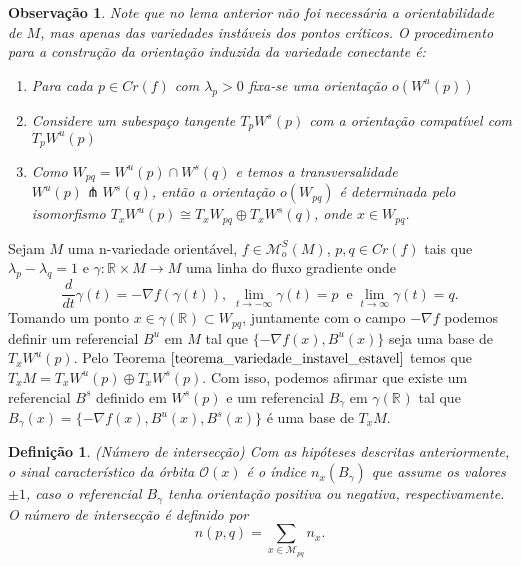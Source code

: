 \documentclass[12pt]{book}
\newtheorem{definicao}[teorema]{Definição}
\newtheorem{observacao}[teorema]{Observação}
\newcommand{\derivada}[2]{\frac{d #1}{d #2}}
\newcommand{\espacomoduli}[2]{\mathcal{M}_{#1#2}}
\newcommand{\espacotangenteponto}[2]{T_{#1}#2}
\newcommand{\funcoesmorsesmale}[1]{\mathcal{M}^{S}_{o}(#1)}
\newcommand{\gradiente}{\nabla f}
\newcommand{\orbitaponto}[1]{\mathcal{O}(#1)}
\newcommand{\pontoscriticos}[1]{\textit{Cr}(#1)}
\newcommand{\retacartesianovariedade}{\real{} \times M}
\newcommand{\real}[1]{\mathbb{R}^{#1}}
\newcommand{\reta}{\real{}}
\newcommand{\variedadeconectantepontos}[2]{W_{#1#2}}
\newcommand{\variedadeestavel}[1]{W^{s}(#1)}
\newcommand{\variedadeinstavel}[1]{W^{u}(#1)}
\begin{document}
	\begin{observacao}
		Note que no lema anterior não foi necessária a orientabilidade de $M$, mas apenas das variedades instáveis dos pontos críticos. O procedimento para a construção da orientação induzida da variedade conectante é:
		\begin{enumerate}
			\item Para cada $p\in \pontoscriticos{f}$ com $\lambda_{p}>0$ fixa-se uma orientação $o(\variedadeinstavel{p})$
			
			\item Considere um subespaço tangente $\espacotangenteponto{p}{\variedadeestavel{p}}$ com a orientação compatível com $\espacotangenteponto{p}{\variedadeinstavel{p}}$
			
			\item Como $\variedadeconectantepontos{p}{q} = \variedadeinstavel{p}\cap\variedadeestavel{q}$ e temos a transversalidade $\variedadeinstavel{p}\pitchfork\variedadeestavel{q}$, então a orientação $o(\variedadeconectantepontos{p}{q})$ é determinada pelo isomorfismo $\espacotangenteponto{x}{\variedadeinstavel{p}}\cong \espacotangenteponto{x}{\variedadeconectantepontos{p}{q}}\oplus \espacotangenteponto{x}{\variedadeestavel{q}}$, onde $x \in \variedadeconectantepontos{p}{q}$.
		\end{enumerate}
	\end{observacao}

	Sejam $M$ uma n-variedade orientável, $f \in \funcoesmorsesmale{M}$, $p,q\in \pontoscriticos{f}$ tais que $\lambda_{p}-\lambda_{q} = 1$ e $\gamma:\retacartesianovariedade\to M$ uma linha do fluxo gradiente onde 
	$$
	\derivada{}{t}\gamma(t) = -\gradiente(\gamma(t)), \; \lim_{t \to -\infty}\gamma(t) = p\;\;\text{e}\; \lim_{t \to \infty}\gamma(t) = q.
	$$
	Tomando um ponto $x \in \gamma(\reta) \subset \variedadeconectantepontos{p}{q}$, juntamente com o campo $-\gradiente$ podemos definir um referencial $B^{u}$ em $M$ tal que $\{-\gradiente(x), B^{u}(x)\}$ seja uma base de $\espacotangenteponto{x}{\variedadeinstavel{p}}$. Pelo Teorema $\ref{teorema_variedade_instavel_estavel}$ temos que $\espacotangenteponto{x}{M}=\espacotangenteponto{x}{\variedadeinstavel{p}}\oplus\espacotangenteponto{x}{\variedadeestavel{p}}$. Com isso, podemos afirmar que existe um referencial $B^{s}$ definido em $\variedadeestavel{p}$ e um referencial $B_{\gamma}$ em $\gamma(\reta)$ tal que $B_{\gamma}(x) = \{-\gradiente(x), B^{u}(x), B^{s}(x)\}$ é uma base de $\espacotangenteponto{x}{M}$.
	
	\begin{definicao}
		(Número de intersecção) Com as hipóteses descritas anteriormente, o sinal característico da órbita $\orbitaponto{x}$ é o índice $n_{x}(B_{\gamma})$ que assume os valores $\pm 1$, caso o referencial $B_{\gamma}$ tenha orientação positiva ou negativa, respectivamente. O número de intersecção é definido por 
		$$
		n(p,q) = \sum_{x \in \espacomoduli{p}{q} }n_{x}.
		$$
	\end{definicao}
	
\end{document}
